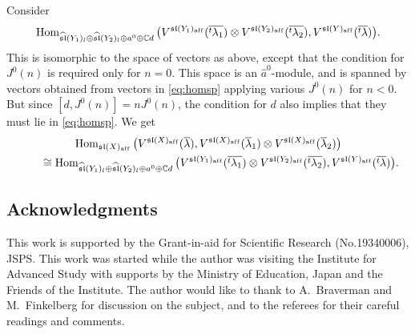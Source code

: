 \documentclass[pdftex]{sigma}
\theoremstyle{definition}
\numberwithin{equation}{section}
\newcommand{\lsp}[2]{{\mskip-.3mu}{}^{#1}\mskip-1mu{#2}}
\newcommand{\C}{{\mathbb C}}
\newcommand{\algsl}{\operatorname{\mathfrak{sl}}} %
\newcommand{\Hom}{\operatorname{Hom}}
\newcommand{\aff}{\mathrm{af\/f}}
\begin{document}
Consider
\begin{equation*}
  \Hom_{\widehat{\algsl}(Y_1)_l\oplus\widehat{\algsl}(Y_2)_l\oplus
    a^0\oplus \C d}
  \big(V^{{\algsl}(Y_1)_\aff}(\overline{\lsp{t}\lambda_1})
  \otimes V^{{\algsl}(Y_2)_\aff}(\overline{\lsp{t}\lambda_2}),
  V^{{\algsl}(Y)_\aff}(\overline{\lsp{t}\lambda})\big).
\end{equation*}
This is isomorphic to the space of vectors as above, except that the
condition for $J^0(n)$ is required only for $n=0$.
%
This space is an $\widehat{a}^0$-module, and is spanned by vectors
obtained from vectors in \eqref{eq:homsp} applying various $J^0(n)$
for $n < 0$. But since $[d, J^0(n)] = n J^0(n)$, the condition for $d$
also implies that they must lie in \eqref{eq:homsp}.
%
We get
\begin{gather}
  \Hom_{{\algsl}(X)_\aff}\big(V^{{\algsl}(X)_\aff}(\overline\lambda),
  V^{{\algsl}(X)_\aff}(\overline\lambda_1)\otimes
  V^{{\algsl}(X)_\aff}(\overline\lambda_2)\big)\nonumber
\\
 \qquad{} \cong
  \Hom_{\widehat{\algsl}(Y_1)_l\oplus\widehat{\algsl}(Y_2)_l \oplus
    {a}^0\oplus \C d}
  \big(V^{{\algsl}(Y_1)_\aff}(\overline{\lsp{t}\lambda_1})
  \otimes V^{{\algsl}(Y_2)_\aff}(\overline{\lsp{t}\lambda_2}),
  V^{{\algsl}(Y)_\aff}(\overline{\lsp{t}\lambda})\big).\label{eq:branchtensor}
\end{gather}

\subsection*{Acknowledgments}
This work is supported by the Grant-in-aid
for Scientif\/ic Research (No.19340006), JSPS.
This work was started while the author was visiting the
Institute for Advanced Study with supports by the Ministry of
Education, Japan and the Friends of the Institute.
The author would like to thank to A.~Braverman and M.~Finkelberg for discussion on the
subject, and
to the referees for their careful readings and comments.
\end{document}
